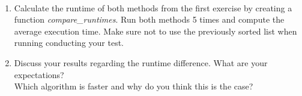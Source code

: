 \newpage
{} \\
\begin{enumerate}
	\item
	Calculate the runtime of both methods from the first exercise by creating a function \textit{compare\_runtimes}.
	Run both methods 5 times and compute the average execution time. Make sure not to use the previously sorted list when running conducting your test.
	
	\item
	Discuss your results regarding the runtime difference. 
	What are your expectations? \\
	Which algorithm is faster and why do you think this is the case?
\end{enumerate}
